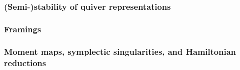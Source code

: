         \subsubsection{(Semi-)stability of quiver representations}
    
        \subsubsection{Framings}
    
        \subsubsection{Moment maps, symplectic singularities, and Hamiltonian reductions}